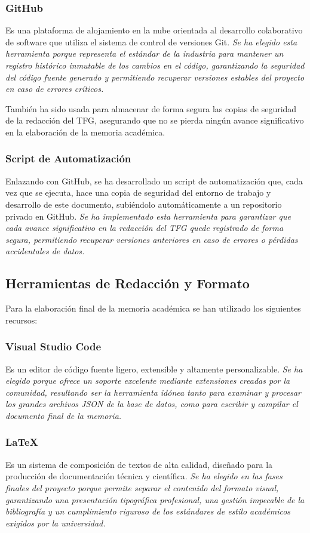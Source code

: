 \subsubsection{GitHub}
Es una plataforma de alojamiento en la nube orientada al desarrollo colaborativo de software que utiliza el sistema de control de versiones Git. \textit{Se ha elegido esta herramienta porque representa el estándar de la industria para mantener un registro histórico inmutable de los cambios en el código, garantizando la seguridad del código fuente generado y permitiendo recuperar versiones estables del proyecto en caso de errores críticos.}

También ha sido usada para almacenar de forma segura las copias de seguridad de la redacción del TFG, asegurando que no se pierda ningún avance significativo en la elaboración de la memoria académica.

\subsubsection{Script de Automatización}
Enlazando con GitHub, se ha desarrollado un script de automatización que, cada vez que se ejecuta, hace una copia de seguridad del entorno de trabajo y desarrollo de este documento, subiéndolo automáticamente a un repositorio privado en GitHub. \textit{Se ha implementado esta herramienta para garantizar que cada avance significativo en la redacción del TFG quede registrado de forma segura, permitiendo recuperar versiones anteriores en caso de errores o pérdidas accidentales de datos.}

\subsection{Herramientas de Redacción y Formato} \label{subsct:herramientas_redaccion}

Para la elaboración final de la memoria académica se han utilizado los siguientes recursos:

\subsubsection{Visual Studio Code}
Es un editor de código fuente ligero, extensible y altamente personalizable. \textit{Se ha elegido porque ofrece un soporte excelente mediante extensiones creadas por la comunidad, resultando ser la herramienta idónea tanto para examinar y procesar los grandes archivos JSON de la base de datos, como para escribir y compilar el documento final de la memoria.}

\subsubsection{LaTeX}
Es un sistema de composición de textos de alta calidad, diseñado para la producción de documentación técnica y científica. \textit{Se ha elegido en las fases finales del proyecto porque permite separar el contenido del formato visual, garantizando una presentación tipográfica profesional, una gestión impecable de la bibliografía y un cumplimiento riguroso de los estándares de estilo académicos exigidos por la universidad.}